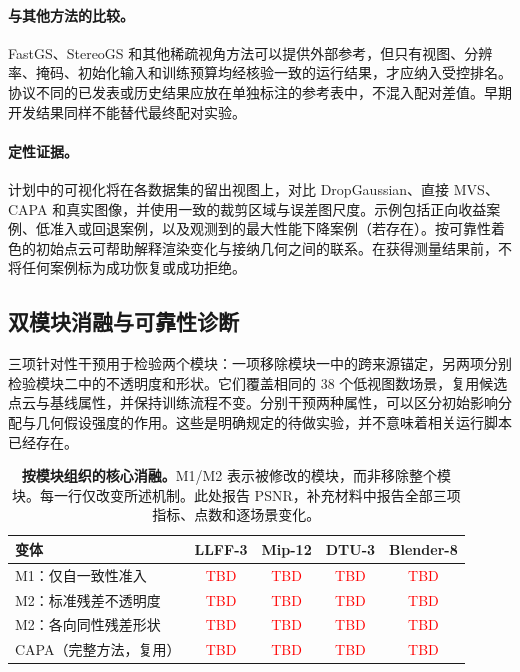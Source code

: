 \documentclass{article}
\newcommand{\ours}{CAPA}
\newcommand{\PH}[1]{\textcolor{red}{#1}}
\newcommand{\pending}{\PH{\textnormal{TBD}}}
\begin{document}
\paragraph{与其他方法的比较。}
FastGS、StereoGS 和其他稀疏视角方法可以提供外部参考，但只有视图、分辨率、掩码、初始化输入和训练预算均经核验一致的运行结果，才应纳入受控排名。协议不同的已发表或历史结果应放在单独标注的参考表中，不混入配对差值。早期开发结果同样不能替代最终配对实验。

\paragraph{定性证据。}
计划中的可视化将在各数据集的留出视图上，对比 DropGaussian、直接 MVS、\ours{} 和真实图像，并使用一致的裁剪区域与误差图尺度。示例包括正向收益案例、低准入或回退案例，以及观测到的最大性能下降案例（若存在）。按可靠性着色的初始点云可帮助解释渲染变化与接纳几何之间的联系。在获得测量结果前，不将任何案例标为成功恢复或成功拒绝。

\subsection{双模块消融与可靠性诊断}
\label{sec:ablations}

三项针对性干预用于检验两个模块：一项移除模块一中的跨来源锚定，另两项分别检验模块二中的不透明度和形状。它们覆盖相同的 38 个低视图数场景，复用候选点云与基线属性，并保持训练流程不变。分别干预两种属性，可以区分初始影响分配与几何假设强度的作用。这些是明确规定的待做实验，并不意味着相关运行脚本已经存在。

\begin{table}[t]
\caption{\textbf{按模块组织的核心消融。}M1/M2 表示被修改的模块，而非移除整个模块。每一行仅改变所述机制。此处报告 PSNR，补充材料中报告全部三项指标、点数和逐场景变化。}
\label{tab:ablation}
\centering\small
\setlength{\tabcolsep}{4pt}
\begin{tabular}{@{}lcccc@{}}
\toprule
变体 & LLFF-3 & Mip-12 & DTU-3 & Blender-8\\
\midrule
M1：仅自一致性准入 & \pending & \pending & \pending & \pending\\
M2：标准残差不透明度 & \pending & \pending & \pending & \pending\\
M2：各向同性残差形状 & \pending & \pending & \pending & \pending\\
\ours{}（完整方法，复用） & \pending & \pending & \pending & \pending\\
\bottomrule
\end{tabular}
\end{table}
\end{document}
